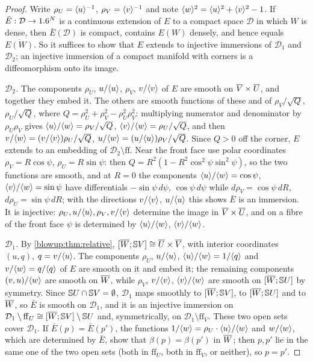 \begin{proof}
Write $\rho_U=\langle u\rangle^{-1}$, $\rho_V=\langle v\rangle^{-1}$ and note $\langle w\rangle^2=\langle u\rangle^2+\langle v\rangle^2-1$. If
$\bar E:\mathcal D\to1.6^N$ is a continuous extension of $E$ to a compact space $\mathcal D$ in
which $W$ is dense, then $\bar E(\mathcal D)$ is compact, contains $E(W)$ densely, and hence
equals $\overline{E(W)}$. So it suffices to show that $E$ extends to injective immersions of
$\mathcal D_1$ and $\mathcal D_2$; an injective immersion of a compact manifold with
corners is a diffeomorphism onto its image.

\emph{$\mathcal D_2$.} The components $\rho_U$, $u/\langle u\rangle$, $\rho_V$, $v/\langle v\rangle$ of $E$ are
smooth on $\overline{V}\times\overline{U}$, and together they embed it. The others are smooth functions of
these and of $\rho_V/\sqrt Q$, $\rho_U/\sqrt Q$, where
$Q=\rho_U^2+\rho_V^2-\rho_U^2\rho_V^2$: multiplying numerator and denominator by
$\rho_U\rho_V$ gives $\langle u\rangle/\langle w\rangle=\rho_V/\sqrt Q$, $\langle v\rangle/\langle w\rangle=\rho_U/\sqrt Q$, and then
$v/\langle w\rangle=(v/\langle v\rangle)\rho_U/\sqrt Q$, $u/\langle w\rangle=(u/\langle u\rangle)\rho_V/\sqrt Q$. Since $Q>0$ off the corner, $E$ extends to an
embedding of $\mathcal D_2\setminus\mathrm{ff}$. Near the front face use polar coordinates
$\rho_V=R\cos\psi$, $\rho_U=R\sin\psi$: then
$Q=R^2(1-R^2\cos^2\psi\sin^2\psi)$, so the two functions are smooth, and at $R=0$ the
components $\langle u\rangle/\langle w\rangle=\cos\psi$, $\langle v\rangle/\langle w\rangle=\sin\psi$ have differentials
$-\sin\psi\,d\psi$, $\cos\psi\,d\psi$ while $d\rho_V=\cos\psi\,dR$, $d\rho_U=\sin\psi\,dR$; with the
directions $v/\langle v\rangle$, $u/\langle u\rangle$ this shows $\bar E$ is an immersion. It is injective:
$\rho_U,u/\langle u\rangle,\rho_V,v/\langle v\rangle$ determine the image in $\overline{V}\times\overline{U}$, and on a fibre of
the front face $\psi$ is determined by $\langle u\rangle/\langle w\rangle$, $\langle v\rangle/\langle w\rangle$.

\emph{$\mathcal D_1$.} By \cref{blowup:thm:relative},
$[\overline{W};\mathbb{S} V]\cong\overline{U}\times\overline{V}$, with interior coordinates $(u,q)$, $q=v/\langle u\rangle$.
The components $\rho_U$, $u/\langle u\rangle$, $\langle u\rangle/\langle w\rangle=1/\langle q\rangle$ and $v/\langle w\rangle=q/\langle q\rangle$ of $E$
are smooth on it and embed it; the remaining components $(v,u)/\langle w\rangle$ are smooth on
$\overline{W}$, while $\rho_V$, $v/\langle v\rangle$, $\langle v\rangle/\langle w\rangle$ are smooth on $[\overline{W};\mathbb{S} U]$ by
symmetry. Since $\mathbb{S} U\cap\mathbb{S} V=\emptyset$, $\mathcal D_1$ maps smoothly to $[\overline{W};\mathbb{S} V]$, to $[\overline{W};\mathbb{S} U]$ and to $\overline{W}$, so $\bar E$ is smooth on $\mathcal D_1$, and
it is an injective immersion on $\mathcal D_1\setminus\mathrm{ff}_U\cong[\overline{W};\mathbb{S} V]\setminus\mathbb{S} U$
and, symmetrically, on $\mathcal D_1\setminus\mathrm{ff}_V$. These two open sets cover $\mathcal
D_1$. If $\bar E(p)=\bar E(p')$, the functions $1/\langle w\rangle=\rho_U\cdot\langle u\rangle/\langle w\rangle$ and
$w/\langle w\rangle$, which are determined by $\bar E$, show that $\beta(p)=\beta(p')$ in $\overline{W}$; then $p,p'$ lie in the same one of the two open sets (both in
$\mathrm{ff}_U$, both in $\mathrm{ff}_V$, or neither), so $p=p'$.
\end{proof}

